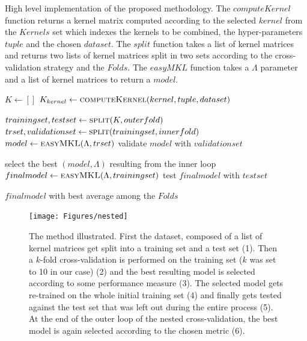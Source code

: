 \begin{algorithm}
    \caption{
        High level implementation of the proposed methodology.
        The $computeKernel$ function returns a kernel matrix computed
        according to the selected $kernel$ from the $Kernels$ set which indexes
        the kernels to be combined, the hyper-parameters $tuple$ and the chosen
        $dataset$.
        The $split$ function takes a list of kernel matrices and returns two lists
        of kernel matrices split in two sets according to the cross-validation
        strategy and the $Folds$.
        The $easyMKL$ function takes a $\Lambda$ parameter and a list of kernel
        matrices to return a $model$.
    }
    \label{alg:method}
    \begin{algorithmic}[1]
        \State $K \gets []$
        \label{line:kernels}
                \State $K_{kernel} \gets \Call{computeKernel}{kernel, tuple, dataset}$
            \EndFor
        \EndFor

            \State $trainingset, testset \gets \Call{split}{K, outerfold}$
            \label{line:osubsets}
                    \State $trset, validationset \gets \Call{split}{trainingset, innerfold}$
                    \label{line:isubsets}
                    \State $model \gets \Call{easyMKL}{\Lambda,trset}$
                    \State validate $model$ with $validationset$
                \EndFor
            \EndFor
            
            \State select the best $(model,\Lambda)$ resulting from the inner loop
            \State $finalmodel \gets \Call{easyMKL}{\Lambda,trainingset}$
            \State test $finalmodel$ with $testset$
        \EndFor

        \State \Return $finalmodel$ with best average among the $Folds$
    \end{algorithmic}
\end{algorithm}

\begin{figure}[ht]
    \centering
    \texttt{[image: Figures/nested]}
    \caption{The method illustrated. First the dataset, composed of a list of
    kernel matrices get split into a training set and a test set (1).
    Then a $k$-fold cross-validation is performed on the training set ($k$ was set to
    10 in our case) (2) and the best resulting model is selected according to some
    performance measure (3). The selected model gets re-trained on the whole initial
    training set (4) and finally gets tested against the test set that was left out
    during the entire process (5). At the end of the outer loop of the nested
    cross-validation, the best model is again selected according to the chosen
    metric (6).}
    \label{fig:method}
\end{figure}

